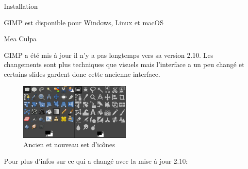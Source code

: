\documentclass[10pt,svgnames,usenames,table]{beamer}
\begin{document}
\begin{frame}{Installation}
    \begin{center}
    GIMP est disponible pour Windows, Linux et macOS
    \vspace{1cm}\Large
    \end{center}
\end{frame}

\begin{frame}{Mea Culpa}
    \begin{center}
    GIMP a été mis à jour il n'y a pas longtemps vers sa version 2.10.
	Les changements sont plus techniques que visuels mais l'interface a un 
	peu changé et certains slides gardent donc cette ancienne interface.
	
	\begin{figure}
        \centering
        \includegraphics[width=0.50\textwidth]{Images/28to210_icons}
        \caption{Ancien et nouveau set d'icônes}
    \end{figure} 
	Pour plus d'infos sur ce qui a changé avec la mise à jour 2.10:
    \end{center}
\end{frame}
\end{document}
